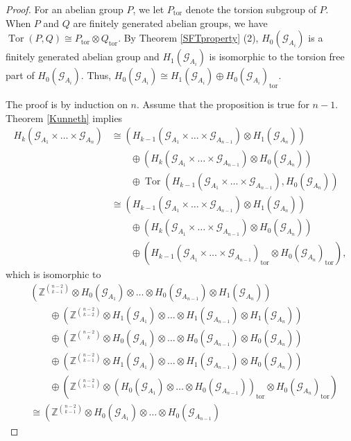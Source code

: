 \documentclass[11pt]{article}
\theoremstyle{definition}
\numberwithin{equation}{section}
\newcommand{\Tor}{\operatorname{Tor}}
\newcommand{\G}{\mathcal{G}}
\newcommand{\Z}{\mathbb{Z}}
\begin{document}
\begin{proof}
For an abelian group $P$, 
we let $P_{\mathrm{tor}}$ denote the torsion subgroup of $P$. 
When $P$ and $Q$ are finitely generated abelian groups, 
we have $\Tor(P,Q)\cong P_{\mathrm{tor}}\otimes Q_{\mathrm{tor}}$. 
By Theorem \ref{SFTproperty} (2), 
$H_0(\G_{A_i})$ is a finitely generated abelian group and 
$H_1(\G_{A_i})$ is isomorphic to the torsion free part of $H_0(\G_{A_i})$. 
Thus, $H_0(\G_{A_i})\cong H_1(\G_{A_i})\oplus H_0(\G_{A_i})_{\mathrm{tor}}$. 

The proof is by induction on $n$. 
Assume that the proposition is true for $n{-}1$. 
Theorem \ref{Kunneth} implies 
\begin{align*}
H_k(\G_{A_1}\times\dots\times\G_{A_n})
&\cong\left(H_{k-1}(\G_{A_1}\times\dots\times\G_{A_{n-1}})
\otimes H_1(\G_{A_n})\right)\\
&\qquad\oplus\left(H_k(\G_{A_1}\times\dots\times\G_{A_{n-1}})
\otimes H_0(\G_{A_n})\right)\\
&\qquad\oplus\Tor(H_{k-1}(\G_{A_1}\times\dots\times\G_{A_{n-1}}),
H_0(\G_{A_n}))\\
&\cong\left(H_{k-1}(\G_{A_1}\times\dots\times\G_{A_{n-1}})
\otimes H_1(\G_{A_n})\right)\\
&\qquad\oplus\left(H_k(\G_{A_1}\times\dots\times\G_{A_{n-1}})
\otimes H_0(\G_{A_n})\right)\\
&\qquad\oplus\left(
H_{k-1}(\G_{A_1}\times\dots\times\G_{A_{n-1}})_{\mathrm{tor}}
\otimes H_0(\G_{A_n})_{\mathrm{tor}}\right), 
\end{align*}
which is isomorphic to 
\begin{align*}
&\left(\Z^{\binom{n-2}{k-1}}\otimes
H_0(\G_{A_1})\otimes\dots\otimes H_0(\G_{A_{n-1}})
\otimes H_1(\G_{A_n})\right)\\
&\qquad\oplus\left(\Z^{\binom{n-2}{k-2}}\otimes
H_1(\G_{A_1})\otimes\dots\otimes H_1(\G_{A_{n-1}})
\otimes H_1(\G_{A_n})\right)\\
&\qquad\oplus\left(\Z^{\binom{n-2}{k}}\otimes
H_0(\G_{A_1})\otimes\dots\otimes H_0(\G_{A_{n-1}})
\otimes H_0(\G_{A_n})\right)\\
&\qquad\oplus\left(\Z^{\binom{n-2}{k-1}}\otimes
H_1(\G_{A_1})\otimes\dots\otimes H_1(\G_{A_{n-1}})
\otimes H_0(\G_{A_n})\right)\\
&\qquad\oplus\left(\Z^{\binom{n-2}{k-1}}\otimes
(H_0(\G_{A_1})\otimes\dots\otimes H_0(\G_{A_{n-1}}))_{\mathrm{tor}}
\otimes H_0(\G_{A_n})_{\mathrm{tor}}\right)\\
&\cong\left(\Z^{\binom{n-2}{k-1}}\otimes
H_0(\G_{A_1})\otimes\dots\otimes H_0(\G_{A_{n-1}})

\end{align*}
\end{proof}
\end{document}
